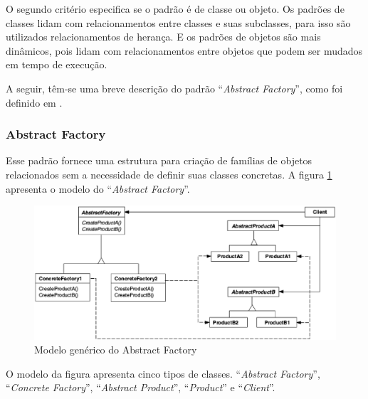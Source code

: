 O segundo critério especifica se o padrão é de classe ou objeto. Os padrões de classes lidam com relacionamentos entre classes e suas subclasses, para isso são utilizados relacionamentos de herança. E os padrões de objetos são mais dinâmicos, pois lidam com relacionamentos entre objetos que podem ser mudados em tempo de execução.

A seguir, têm-se uma breve descrição do padrão ``\textit{Abstract Factory}'', como foi definido em \cite{Gamma:Helm:Johnson:Vlissides:1995}.

\subsubsection{Abstract Factory}

Esse padrão fornece uma estrutura para criação de famílias de objetos relacionados sem a necessidade de definir suas classes concretas. A figura \ref{abstract factory} apresenta o modelo do ``\textit{Abstract Factory}''.

\newpage

\begin{figure}[!h]
	\centering
	\includegraphics[scale=0.5]{figuras/capitulo2/abstract_factory.eps}
	\caption{Modelo genérico do Abstract Factory}
	\label{abstract factory}
\end{figure}

O modelo da figura apresenta cinco tipos de classes. ``\textit{Abstract Factory}'', ``\textit{Concrete Factory}'', ``\textit{Abstract Product}'', ``\textit{Product}'' e ``\textit{Client}''.

